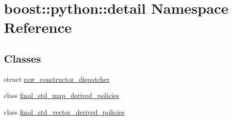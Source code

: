 \hypertarget{namespaceboost_1_1python_1_1detail}{\section{boost\-:\-:python\-:\-:detail \-Namespace \-Reference}
\label{namespaceboost_1_1python_1_1detail}
}
\subsection*{\-Classes}
\begin{DoxyCompactItemize}
\item 
struct \hyperlink{structboost_1_1python_1_1detail_1_1raw__constructor__dispatcher}{raw\-\_\-constructor\-\_\-dispatcher}
\item 
class \hyperlink{classboost_1_1python_1_1detail_1_1final__std__map__derived__policies}{final\-\_\-std\-\_\-map\-\_\-derived\-\_\-policies}
\item 
class \hyperlink{classboost_1_1python_1_1detail_1_1final__std__vector__derived__policies}{final\-\_\-std\-\_\-vector\-\_\-derived\-\_\-policies}
\end{DoxyCompactItemize}
